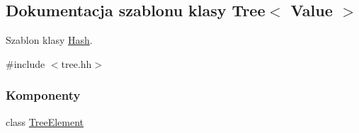\hypertarget{class_tree}{\subsection{Dokumentacja szablonu klasy Tree$<$ Value $>$}
\label{class_tree}
}


Szablon klasy \hyperlink{class_hash}{Hash}.  




{\ttfamily \#include $<$tree.\-hh$>$}

\subsubsection*{Komponenty}
\begin{DoxyCompactItemize}
\item 
class \hyperlink{class_tree_1_1_tree_element}{Tree\-Element}
\end{DoxyCompactItemize}

